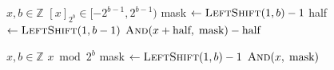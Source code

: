 \begin{algorithm}[ht!]
\caption[Center]{\protect{}}
\label{alg:bit:center}
\begin{algorithmic}[1]
    \Require $x, b \in \mathbb{Z}$
    \Ensure $[x]_{2^b} \in [-2^{b-1}, 2^{b-1})$
    \State mask $\gets \Call{LeftShift}{1, b} - 1$
    \State half $\gets \Call{LeftShift}{1, b-1}$
    \State\Return $\Call{And}{x + \text{half},\; \text{mask}} - \text{half}$
\end{algorithmic}
\end{algorithm}

\begin{algorithm}[ht!]
\caption[Modulo]{\protect{}}
\label{alg:bit:modulo}
\begin{algorithmic}[1]
    \Require $x, b \in \mathbb{Z}$
    \Ensure $x \bmod{2^b}$
    \State mask $\gets \Call{LeftShift}{1, b} - 1$
    \State\Return $\Call{And}{x,\; \text{mask}}$
\end{algorithmic}
\end{algorithm}

\newpage